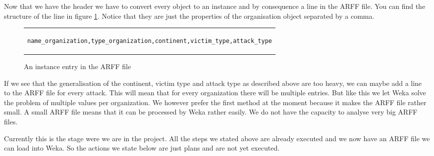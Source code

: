 \documentclass[a4]{article}
\begin{document}
Now that we have the header we have to convert every object to an instance and by consequence a line in the ARFF file. You can find the structure of the line in figure \ref{fig:entry}. Notice that they are just the properties of the organisation object separated by a comma.\par
\begin{figure}[!ht]
\centering
\begin{tabular}{c}
\begin{lstlisting}
name_organization,type_organization,continent,victim_type,attack_type
\end{lstlisting}
\end{tabular}
\caption{An instance entry in the ARFF file}
\label{fig:entry}
\end{figure}
If we see that the generalisation of the continent, victim type and attack type as described above are too heavy, we can maybe add a line to the ARFF file for every attack. This will mean that for every organization there will be multiple entries. But like this we let Weka solve the problem of multiple values per organization. We however prefer the first method at the moment because it makes the ARFF file rather small. A small ARFF file means that it can be processed by Weka rather easily. We do not have the capacity to analyse very big ARFF files.\par
Currently this is the stage were we are in the project. All the steps we stated above are already executed and we now have an ARFF file we can load into Weka. So the actions we state below are just plans and are not yet executed.
\end{document}
